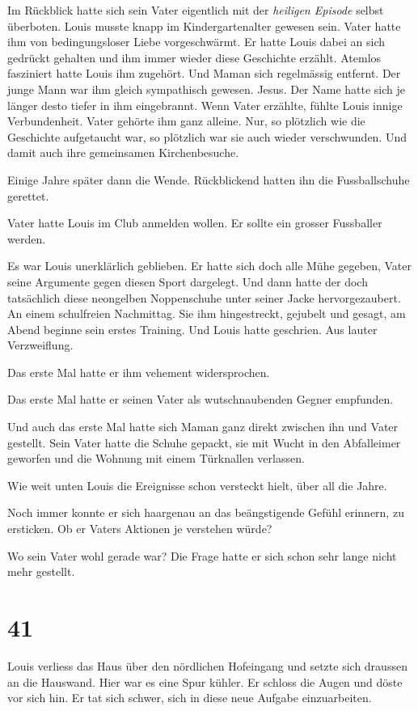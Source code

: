 Im Rückblick hatte sich sein Vater eigentlich mit der \emph{heiligen
Episode} selbst überboten. Louis musste knapp im Kindergartenalter
gewesen sein. Vater hatte ihm von bedingungsloser Liebe vorgeschwärmt.
Er hatte Louis dabei an sich gedrückt gehalten und ihm immer wieder
diese Geschichte erzählt. Atemlos fasziniert hatte Louis ihm zugehört.
Und Maman sich regelmässig entfernt. Der junge Mann war ihm gleich
sympathisch gewesen. Jesus. Der Name hatte sich je länger desto tiefer
in ihm eingebrannt. Wenn Vater erzählte, fühlte Louis innige
Verbundenheit. Vater gehörte ihm ganz alleine. Nur, so plötzlich wie die
Geschichte aufgetaucht war, so plötzlich war sie auch wieder
verschwunden. Und damit auch ihre gemeinsamen Kirchenbesuche.

Einige Jahre später dann die Wende. Rückblickend hatten ihn die
Fussballschuhe gerettet.

Vater hatte Louis im Club anmelden wollen. Er sollte ein grosser
Fussballer werden.

Es war Louis unerklärlich geblieben. Er hatte sich doch alle Mühe
gegeben, Vater seine Argumente gegen diesen Sport dargelegt. Und dann
hatte der doch tatsächlich diese neongelben Noppenschuhe unter seiner
Jacke hervorgezaubert. An einem schulfreien Nachmittag. Sie ihm
hingestreckt, gejubelt und gesagt, am Abend beginne sein erstes
Training. Und Louis hatte geschrien. Aus lauter Verzweiflung.

Das erste Mal hatte er ihm vehement widersprochen.

Das erste Mal hatte er seinen Vater als wutschnaubenden Gegner
empfunden.

Und auch das erste Mal hatte sich Maman ganz direkt zwischen ihn und
Vater gestellt. Sein Vater hatte die Schuhe gepackt, sie mit Wucht in
den Abfalleimer geworfen und die Wohnung mit einem Türknallen verlassen.

Wie weit unten Louis die Ereignisse schon versteckt hielt, über all die
Jahre.

Noch immer konnte er sich haargenau an das beängstigende Gefühl
erinnern, zu ersticken. Ob er Vaters Aktionen je verstehen würde?

Wo sein Vater wohl gerade war? Die Frage hatte er sich schon sehr lange
nicht mehr gestellt.

\chapter{41}\label{section-40}

Louis verliess das Haus über den nördlichen Hofeingang und setzte sich
draussen an die Hauswand. Hier war es eine Spur kühler. Er schloss die
Augen und döste vor sich hin. Er tat sich schwer, sich in diese neue
Aufgabe einzuarbeiten.


